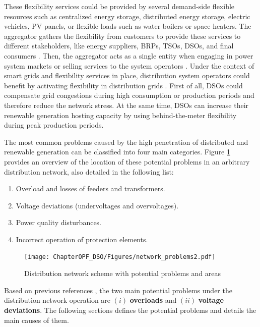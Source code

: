 These flexibility services could be provided by several demand-side flexible resources such as centralized energy storage, distributed energy storage, electric vehicles, PV panels, or flexible loads such as water boilers or space heaters. The aggregator gathers the flexibility from customers to provide these services to different stakeholders, like energy suppliers, BRPs, TSOs, DSOs, and final consumers \cite{USEFFoundation2015a, Olivella2018}. Then, the aggregator acts as a single entity when engaging in power system markets or selling services to the system operators \cite{BURGER2017}. Under the context of smart grids and flexibility services in place, distribution system operators could benefit by activating flexibility in distribution grids \cite{USEFFoundation2015a, spiliotis2016demand, esmat2016conf, hashemi2016}. First of all, DSOs could compensate grid congestions during high consumption or production periods and therefore reduce the network stress. At the same time, DSOs can increase their renewable generation hosting capacity by using behind-the-meter flexibility during peak production periods. 

The most common problems caused by the high penetration of distributed and renewable generation can be classified into four main categories. Figure \ref{fig:network_problems} provides an overview of the location of these potential problems in an arbitrary distribution network, also detailed in the following list:  

\begin{enumerate}
\item Overload and losses of feeders and transformers. 
\item Voltage deviations (undervoltages and overvoltages).
\item Power quality disturbances.
\item Incorrect operation of protection elements. 
\end{enumerate}

\begin{figure}[h]
	\centering
	\texttt{[image: ChapterOPF\_DSO/Figures/network\_problems2.pdf]}
		\caption{Distribution network scheme with potential problems and areas}
	\label{fig:network_problems}  
\end{figure}

Based on previous references \cite{ISMAEL20191002, Bollen2011}, the two main potential problems under the distribution network operation are $(i)$ \textbf{overloads} and  $(ii)$ \textbf{voltage deviations}. The following sections defines the potential problems and details the main causes of them. 



